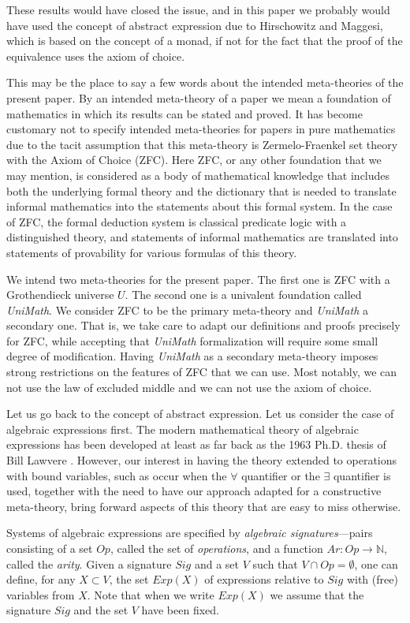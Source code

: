 \documentclass[12pt]{amsart}
\numberwithin{proposition}{subsection}
\newcommand{\sr}{\rightarrow}
\newcommand{\nn}{{\mathbb N}}
\newcommand{\nat}{\nn}
\begin{document}
These results would have closed the issue, and in
this paper we probably would have used the concept of abstract expression
due to Hirschowitz and Maggesi, which is based
on the concept of a monad, if not for the fact that the proof of the equivalence
uses the axiom of choice.

This may be the place to say a few words about the intended meta-theories of
the present paper. By an intended meta-theory of a paper we mean a foundation
of mathematics in which its results can be stated and proved. It has become
customary not to specify intended meta-theories for papers in pure mathematics
due to the tacit assumption that this meta-theory is Zermelo-Fraenkel set
theory with the Axiom of Choice (ZFC).  Here ZFC, or any other foundation that we
may mention, is considered as a body of mathematical knowledge that includes
both the underlying formal theory and the dictionary that is needed to
translate informal mathematics into the statements about this formal system. In
the case of ZFC, the formal deduction system is classical predicate logic
with a distinguished theory, and statements of informal mathematics are
translated into statements of provability for various formulas of this
theory.

We intend two meta-theories for the present paper. The first one is 
ZFC with a Grothendieck universe $U$. The second one is a univalent foundation
called {\em UniMath}.  We consider ZFC to be the primary meta-theory and {\em UniMath} a
secondary one. That is, we take care to adapt our definitions and proofs
precisely for ZFC, while accepting that {\em UniMath} formalization will require
some small degree of modification.
%
Having {\em UniMath} as a secondary meta-theory imposes strong
restrictions on the features of ZFC that we can use.  Most
notably, we can not use the law of excluded middle and we can not use the axiom
of choice.

Let us go back to the concept of abstract expression. Let us consider the
case of algebraic expressions first.  The modern mathematical theory of algebraic
expressions has been developed at least as far back as the 1963 Ph.D.{} thesis of
Bill Lawvere \cite{Lawvere}. However, our interest in having the theory
extended to operations with bound variables, such as occur when the $\forall$
quantifier or the $\exists$ quantifier is used,
together with the need to have our approach adapted for a
constructive meta-theory, bring forward aspects of this theory that are easy to
miss otherwise.

Systems of algebraic expressions are specified by {\em algebraic signatures}---pairs
consisting of a set $Op$, called the set of {\em operations}, and a function
$Ar:Op\sr \nat$, called the {\em arity}.  Given a signature $Sig$ and a set $V$ such that
$V\cap Op=\emptyset$, one can define, for any $X\subset V$, the set $Exp(X)$ of
expressions relative to $Sig$ with (free) variables from $X$. Note that when we
write $Exp(X)$ we assume that the signature $Sig$ and the set $V$ have been
fixed.
\end{document}
